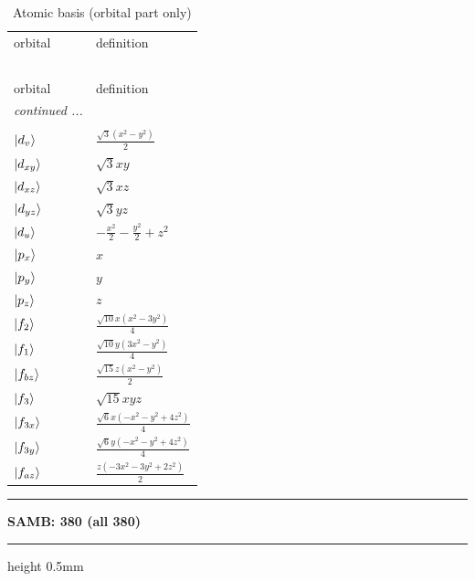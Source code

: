 \documentclass[fleqn,10pt,landscape]{jsarticle}
\begin{document}
\renewcommand{\arraystretch}{1.6}
\begin{longtable}[l]{ll}
\captionsetup{justification=raggedright, singlelinecheck=off}
\caption{Atomic basis (orbital part only)}
 \\
 \hline \hline
orbital & definition \\ \hline \endfirsthead

\multicolumn{1}{l}{\tablename\ \thetable{}} \\
 \hline \hline
orbital & definition \\ \hline \endhead

 \hline \hline
\multicolumn{1}{r}{\footnotesize\it continued ...} \\ \endfoot

 \hline \hline
\multicolumn{1}{r}{} \\ \endlastfoot

$ \ket{d_{v}} $ & $ \frac{\sqrt{3} \left(x^{2} - y^{2}\right)}{2} $ \\
$ \ket{d_{xy}} $ & $ \sqrt{3} x y $ \\
$ \ket{d_{xz}} $ & $ \sqrt{3} x z $ \\
$ \ket{d_{yz}} $ & $ \sqrt{3} y z $ \\
$ \ket{d_{u}} $ & $ - \frac{x^{2}}{2} - \frac{y^{2}}{2} + z^{2} $ \\ \hline
$ \ket{p_{x}} $ & $ x $ \\
$ \ket{p_{y}} $ & $ y $ \\
$ \ket{p_{z}} $ & $ z $ \\ \hline
$ \ket{f_{2}} $ & $ \frac{\sqrt{10} x \left(x^{2} - 3 y^{2}\right)}{4} $ \\
$ \ket{f_{1}} $ & $ \frac{\sqrt{10} y \left(3 x^{2} - y^{2}\right)}{4} $ \\
$ \ket{f_{bz}} $ & $ \frac{\sqrt{15} z \left(x^{2} - y^{2}\right)}{2} $ \\
$ \ket{f_{3}} $ & $ \sqrt{15} x y z $ \\
$ \ket{f_{3x}} $ & $ \frac{\sqrt{6} x \left(- x^{2} - y^{2} + 4 z^{2}\right)}{4} $ \\
$ \ket{f_{3y}} $ & $ \frac{\sqrt{6} y \left(- x^{2} - y^{2} + 4 z^{2}\right)}{4} $ \\
$ \ket{f_{az}} $ & $ \frac{z \left(- 3 x^{2} - 3 y^{2} + 2 z^{2}\right)}{2} $ \\
\end{longtable}
\vspace{5mm}
\noindent \rule[0.5mm]{5mm}{0.5mm}\hspace{3mm}\textbf{SAMB: 380 (all 380)}\hspace{3mm}\leaders\hrule height 0.5mm\hfill\kern0pt
\vspace{3mm}
\end{document}
